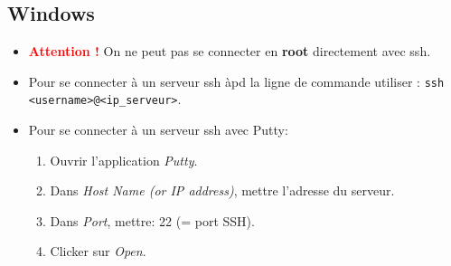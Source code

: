 \documentclass[a4paper]{article}
\renewcommand{\tt}{\texttt}
\begin{document}
\subsection{Windows} \label{subsec:WinSSH}





\begin{itemize}





\item \textcolor{red}{\textbf{Attention !}} On ne peut pas se connecter en \textbf{root} directement avec ssh.





\item Pour se connecter à un serveur ssh àpd la ligne de commande utiliser : \tt{ssh <username>@<ip\_serveur>}.





\item Pour se connecter à un serveur ssh avec Putty:
\begin{enumerate}
    \item Ouvrir l'application \textit{Putty}.
    \item Dans \textit{Host Name (or IP address)}, mettre l'adresse du serveur.
    \item Dans \textit{Port}, mettre: 22 (= port SSH).
    \item Clicker sur \textit{Open}.
\end{enumerate}





\end{itemize}




















\appendix \newpage
\end{document}
